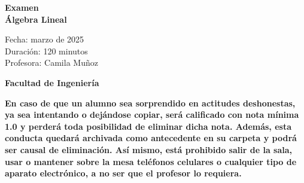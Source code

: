 \documentclass[a4paper]{article}
\begin{document}
\thispagestyle{fancy}
\vspace*{1cm}

\begin{minipage}[r]{12cm}
    \begin{flushright}
    \end{flushright}
\end{minipage}

\begin{center}
\Large{\textbf{Examen \\ Álgebra Lineal\\ }}
\end{center}
\vspace{1cm}
\begin{minipage}[r]{15cm}
\begin{flushleft}

Fecha: marzo de 2025 \\%
Duración: 120 minutos  \\
Profesora: Camila Muñoz\\
\end{flushleft}
\end{minipage}
\vspace{2cm}
\begin{center}
\Large{\textbf{Facultad de Ingeniería}}
\end{center}
\vspace{1cm}
\textbf{En caso de que un alumno sea sorprendido en actitudes deshonestas, ya sea intentando o
dejándose copiar, será calificado con nota mínima 1.0 y perderá toda posibilidad de eliminar
dicha nota. Además, esta conducta quedará archivada como antecedente en su carpeta y
podrá ser causal de eliminación.
Así mismo, está prohibido salir de la sala, usar o mantener sobre la mesa teléfonos celulares
o cualquier tipo de aparato electrónico, a no ser que el profesor lo requiera.}\\



\vspace{5cm}
\newpage
\thispagestyle{empty}
\end{document}
